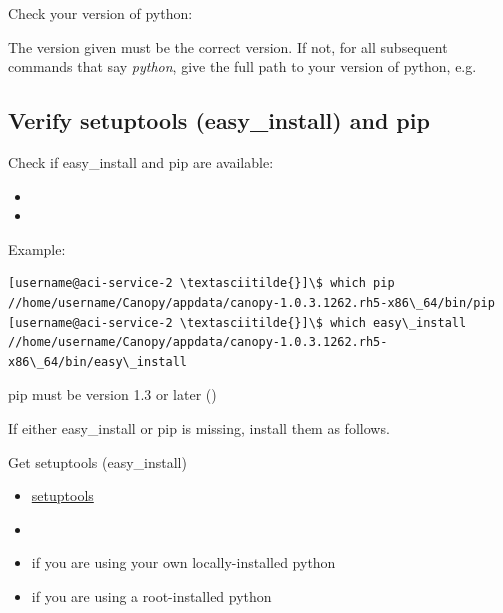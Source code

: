 \documentclass[letterpaper,10pt,english]{sphinxmanual}
\begin{document}
Check your version of python: 

The version given must be the correct version. If not, for all subsequent commands that say \emph{python}, give the full path to your version of python, e.g. 


\subsection{Verify setuptools (easy\_install) and pip}
\label{1_0_installation:verify-setuptools-easy-install-and-pip}
Check if easy\_install and pip are available:
\begin{itemize}
\item {} 

\item {} 

\end{itemize}

Example:

\begin{Verbatim}[commandchars=\\\{\}]
[username@aci-service-2 \textasciitilde{}]\$ which pip
//home/username/Canopy/appdata/canopy-1.0.3.1262.rh5-x86\_64/bin/pip
[username@aci-service-2 \textasciitilde{}]\$ which easy\_install
//home/username/Canopy/appdata/canopy-1.0.3.1262.rh5-x86\_64/bin/easy\_install
\end{Verbatim}

pip must be version 1.3 or later ()

If either easy\_install or pip is missing, install them as follows.

Get setuptools (easy\_install)
\begin{itemize}
\item {} 
\href{https://pypi.python.org/pypi/setuptools}{setuptools}

\item {} 

\item {} 
 if you are using your own locally-installed python

\item {} 
 if you are using a root-installed python

\end{itemize}
\end{document}

